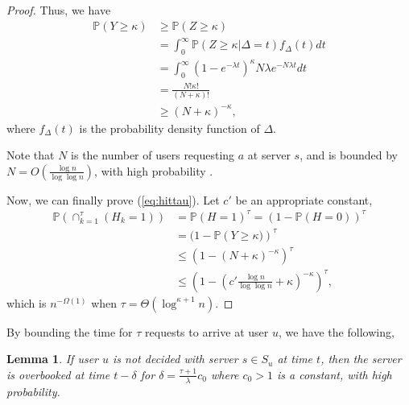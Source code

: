 \documentclass[conference]{IEEEtran}
\newtheorem{lemma}[theorem]{Lemma}
\newcommand{\prob}[1]{\mathbb{P}\left( #1 \right)}
\begin{document}
\begin{proof}
Thus, we have 
\begin{align*}
\prob{Y\geq\kappa} & \geq \prob{Z\geq \kappa}\\
	& = \int_0^\infty \prob{Z\geq\kappa|\Delta=t}f_{\Delta}(t) dt \\
	& = \int_0^\infty (1-e^{-\lambda t})^{\kappa}N\lambda e^{-N\lambda t} dt \\
	& = \frac{N!\kappa !}{(N+\kappa) !} \\
	& \geq (N+\kappa)^{-\kappa},
\end{align*}
where $f_{\Delta}(t)$ is the probability density function of $\Delta$.

Note that $N$ is the number of users requesting $a$ at server $s$, and is bounded by $N = O(\frac{\log n}{\log\log n})$, with high probability \cite{raab1998balls}.

Now, we can finally prove (\ref{eq:hittau}). Let $c'$ be an appropriate constant,\\
\begin{align*}
\prob{\cap_{k=1}^{\tau}(H_k=1)} & = \prob{H=1}^{\tau} = (1-\prob{H=0})^{\tau} \\
	& = (1-\prob{Y\geq\kappa)}^{\tau} \\
	& \leq (1-(N+\kappa)^{-\kappa})^{\tau} \\
	& \leq (1-(c'\frac{\log n}{\log\log n}+\kappa)^{-\kappa})^{\tau},
\end{align*}
which is $n^{-\Omega(1)}$ when $\tau = \Theta(\log^{\kappa+1}n)$.
\end{proof}

By bounding the time for $\tau$ requests to arrive at user $u$, we have the following,
\begin{lemma}\label{lem:timefortau}
If user $u$ is not \textsl{decided} with server $s\in S_u$ at time $t$, then the server is \textsl{overbooked} at time $t-\delta$ for $\delta = \frac{\tau+1}{\lambda}c_{0}$ where $c_0>1$ is a constant, with high probability.
\end{lemma}
\end{document}
